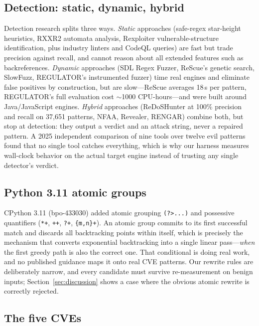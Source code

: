 \documentclass[11pt,a4paper]{article}
\begin{document}
\subsection{Detection: static, dynamic, hybrid}

Detection research splits three ways. \textit{Static} approaches (safe-regex star-height heuristics, RXXR2 automata analysis, Rexploiter vulnerable-structure identification, plus industry linters and CodeQL queries) are fast but trade precision against recall, and cannot reason about all extended features such as backreferences. \textit{Dynamic} approaches (SDL Regex Fuzzer, ReScue's genetic search, SlowFuzz, REGULATOR's instrumented fuzzer) time real engines and eliminate false positives by construction, but are slow---ReScue averages 18\,s per pattern, REGULATOR's full evaluation cost $\sim$1000 CPU-hours---and were built around Java/JavaScript engines. \textit{Hybrid} approaches (ReDoSHunter at 100\% precision and recall on 37,651 patterns, NFAA, Revealer, RENGAR) combine both, but stop at detection: they output a verdict and an attack string, never a repaired pattern. A 2025 independent comparison of nine tools over twelve evil patterns found that no single tool catches everything, which is why our harness measures wall-clock behavior on the actual target engine instead of trusting any single detector's verdict.

\subsection{Python 3.11 atomic groups}

CPython 3.11 (bpo-433030) added atomic grouping \verb!(?>...)! and possessive quantifiers (\verb!*+!, \verb!++!, \verb!?+!, \verb!{m,n}+!). An atomic group commits to its first successful match and discards all backtracking points within itself, which is precisely the mechanism that converts exponential backtracking into a single linear pass---\textit{when} the first greedy path is also the correct one. That conditional is doing real work, and no published guidance maps it onto real CVE patterns. Our rewrite rules are deliberately narrow, and every candidate must survive re-measurement on benign inputs; Section~\ref{sec:discussion} shows a case where the obvious atomic rewrite is correctly rejected.

\subsection{The five CVEs}
\end{document}
